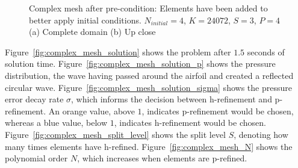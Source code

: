 \begin{figure}[H]
    \centering
    \hfill
    \caption{Complex mesh after pre-condition: Elements have been added to better apply initial 
        conditions. \(N_{initial} = 4\), \(K = 24072\), \(S = 3\), \(P = 4\) (a) Complete domain (b) 
        Up close}\label{fig:complex_mesh_pre_condition}
\end{figure}

Figure~\ref{fig:complex_mesh_solution} shows the problem after \(1.5\) seconds of solution time.
Figure~\ref{fig:complex_mesh_solution_p} shows the pressure distribution, the wave having passed
around the airfoil and created a reflected circular wave.
Figure~\ref{fig:complex_mesh_solution_sigma} shows the pressure error decay rate \(\sigma \), which
informs the decision between h-refinement and p-refinement. An orange value, above \(1\), indicates
p-refinement would be chosen, whereas a blue value, below \(1\), indicates h-refinement would be
chosen. Figure~\ref{fig:complex_mesh_split_level} shows the split level \(S\), denoting how many
times elements have h-refined. Figure~\ref{fig:complex_mesh_N} shows the polynomial order \(N\),
which increases when elements are p-refined.

